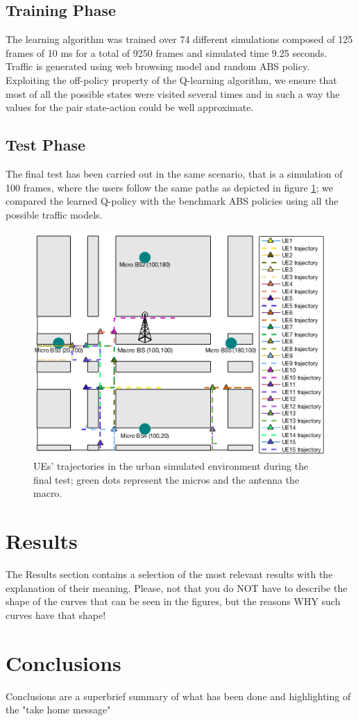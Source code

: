 \documentclass[conference,10pt]{IEEEtran}
\begin{document}
\subsection{Training Phase}
The learning algorithm was trained over 74 different simulations composed of 125 frames of 10 ms for a total of 9250 frames and simulated time 9.25 seconds. Traffic is generated using web browsing model and random ABS policy.
Exploiting the off-policy property of the Q-learning algorithm, we ensure that most of all the possible states were visited several times and in such a way the values for the pair state-action could be well approximate.
\subsection{Test Phase}
The final test has been carried out in the same scenario, that is a simulation of 100 frames, where the users follow the same paths as depicted in figure \ref{img:map}; we compared the learned Q-policy with the benchmark ABS policies using all the possible traffic models.
\begin{figure}[h]
\includegraphics[scale=0.54]{figures/traj.png}
\caption{UEs' trajectories in the urban simulated environment during the final test; green dots represent the micros and the antenna the macro.}\label{img:map} 
\end{figure}
      
\section{Results}\label{sec:res}
The Results section contains a selection of the most relevant results with the explanation of their meaning. Please, not that you do NOT have to describe the shape of the curves that can be seen in the figures, but the reasons WHY such curves have that shape!
\section{Conclusions}\label{sec:conclusion}
Conclusions are a superbrief summary of what has been done and highlighting of the "take home message"
\newpage
\nocite{*}


\end{document}
